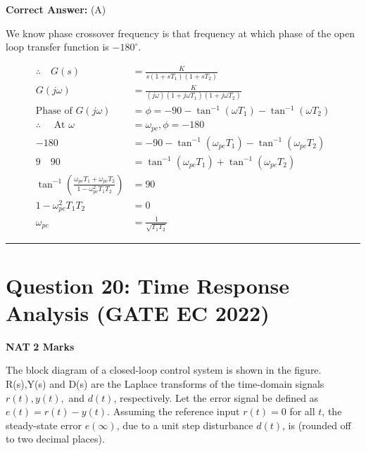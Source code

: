 \documentclass[11pt,a4paper]{article}
\begin{document}
\noindent \textbf{Correct Answer:} (A)

\begin{tcolorbox}[solbox, title=Detailed Solution -- Question 19]
We know phase crossover frequency is that frequency at which phase of the open loop transfer function is $-180^{\circ}$.

\[
\begin{aligned}
\therefore \quad G(s) & =\frac{K}{s\left(1+s T_{1}\right)\left(1+s T_{2}\right)} \\
G(j \omega) & =\frac{K}{(j \omega)\left(1+j \omega T_{1}\right)\left(1+j \omega T_{2}\right)} \\
\text{Phase of }G(j \omega) & =\phi =-90-\tan ^{-1}\left(\omega T_{1}\right) - \tan ^{-1}\left(\omega T_{2}\right) \\
\therefore \quad \text { At } \omega &=\omega_{p c}, \phi =-180  \\
-180 & =-90-\tan ^{-1}\left(\omega_{p c} T_{1}\right)-\tan ^{-1}\left(\omega_{p c} T_{2}\right) \\
9 \quad 90 & =\tan ^{-1}\left(\omega_{p c} T_{1}\right)+\tan ^{-1}\left(\omega_{p c} T_{2}\right) \\
\tan ^{-1}\left(\frac{\omega_{p c} T_{1}+\omega_{p c} T_{2}}{1-\omega_{p c}^{2} T_{1} T_{2}}\right) & =90 \\
1-\omega_{p c}^{2} T_{1} T_{2} & =0 \\
\omega_{p c} & =\frac{1}{\sqrt{T_{1} T_{2}}}
\end{aligned}
\]
\end{tcolorbox}

\vspace{1.5em}
\hrule
\vspace{1.5em}

\section*{Question 20: Time Response Analysis (GATE EC 2022)}
\noindent \textbf{\color{primary}NAT} \hfill \textbf{\color{secondary}2 Marks}


\noindent The block diagram of a closed-loop control system is shown in the figure. R(s),Y(s) and D(s) are the Laplace transforms of the time-domain signals $r(t),y(t),$ and $d(t)$, respectively. Let the error signal be defined as $e(t)=r(t)-y(t)$. Assuming the
reference input $r(t)=0$ for all $t$, the steady-state error $e(\infty )$, due to a unit step
disturbance $d(t)$, is \underline{\hspace{1.5cm}} (rounded off to two decimal places).
\end{document}
